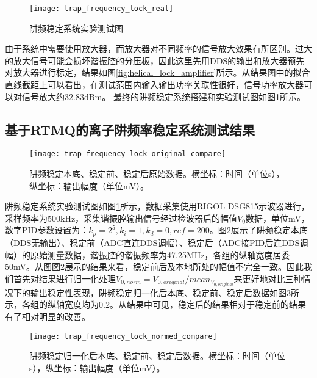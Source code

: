\begin{figure}
    \centering
    \caption[阱频稳定系统实验测试图]{阱频稳定系统实验测试图\label{fig:trap_frequency_lock_real}}
    \texttt{[image: trap\_frequency\_lock\_real]}
\end{figure}


由于系统中需要使用放大器，而放大器对不同频率的信号放大效果有所区别。过大的放大信号可能会损坏谐振腔的分压板，因此这里先用DDS的输出和放大器预先对放大器进行标定，结果如图\ref{fig:helical_lock_amplifier}所示。从结果图中的拟合直线截距上可以看出，在测试范围内输入输出功率关联性很好，信号功率放大器可以对信号放大约32.83dBm。
最终的阱频稳定系统搭建和实验测试图如图\ref{fig:trap_frequency_lock_real}所示。


\subsection[基于RTMQ的离子阱频率稳定系统测试结果]{基于RTMQ的离子阱频率稳定系统测试结果}

\begin{figure}
    \centering
    \caption[阱频稳定本底、稳定前、稳定后原始数据]{阱频稳定本底、稳定前、稳定后原始数据。横坐标：时间（单位s），纵坐标：输出幅度（单位mV）。\label{fig:trap_frequency_lock_original_compare}}
    \texttt{[image: trap\_frequency\_lock\_original\_compare]}
\end{figure}



阱频稳定系统实验测试图如图\ref{fig:trap_frequency_lock_real}所示，数据采集使用RIGOL DSG815示波器进行，采样频率为500kHz，采集谐振腔输出信号经过检波器后的幅值$V_0$数据，单位mV，数字PID参数设置为：$k_p=2^5,k_i=1,k_d=0, ref=200$。图\ref{fig:trap_frequency_lock_original_compare}展示了阱频稳定本底（DDS无输出）、稳定前（ADC直连DDS调幅）、稳定后（ADC接PID后连DDS调幅）的原始测量数据，谐振腔的谐振频率为47.25MHz，各组的纵轴宽度居委50mV。从图图\ref{fig:trap_frequency_lock_original_compare}展示的结果来看，稳定前后及本地所处的幅值不完全一致。因此我们首先对结果进行归一化处理$V_{0,norm}=V_{0,original}/mean_{V_{0,original}}$来更好地对比三种情况下的输出稳定性表现，阱频稳定归一化后本底、稳定前、稳定后数据如图\ref{fig:trap_frequency_lock_normed_compare}所示，各组的纵轴宽度均为0.2。从结果中可见，稳定后的结果相对于稳定前的结果有了相对明显的改善。

\begin{figure}
    \centering
    \caption[阱频稳定归一化后本底、稳定前、稳定后数据]{阱频稳定归一化后本底、稳定前、稳定后数据。横坐标：时间（单位s），纵坐标：输出幅度（单位mV）。\label{fig:trap_frequency_lock_normed_compare}}
    \texttt{[image: trap\_frequency\_lock\_normed\_compare]}
\end{figure}

